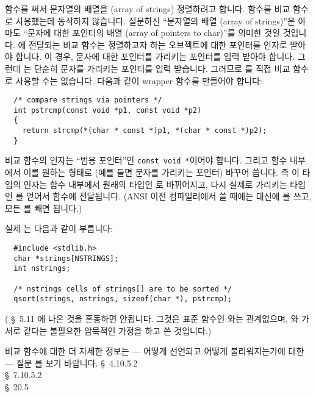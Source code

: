 \begin{faq}
	 함수를 써서 문자열의 배열을 (array of strings)
	정렬하려고 합니다.
	 함수를 비교 함수로 사용했는데 동작하지 않습니다.
\A
	질문하신 ``문자열의 배열 (array of strings)''은 아마도
	``문자에 대한 포인터의 배열 (array of pointers to char)''를
	의미한 것일 것입니다.  에 전달되는 비교 함수는
	정렬하고자 하는 오브젝트에 대한 포인터를 인자로 받아야 합니다.
	이 경우, 문자에 대한 포인터를 가리키는 포인터를 입력 받아야 합니다.
	그런데 는 단순히 문자를 가리키는 포인터를 입력
	받습니다.  그러므로 를 직접 비교 함수로 사용할 수는
	없습니다.  다음과 같이 wrapper 함수를 만들어야 합니다:

\begin{verbatim}
  /* compare strings via pointers */
  int pstrcmp(const void *p1, const void *p2)
  {
    return strcmp(*(char * const *)p1, *(char * const *)p2);
  }
\end{verbatim}

	비교 함수의 인자는 ``범용 포인터''인 \verb+const void *+이어야
        합니다. 그리고 함수 내부에서 이를 원하는 형태로 (예를 들면 문자를
        가리키는 포인터) 바꾸어 씁니다. 즉 이 타입의 인자는 함수 내부에서
        원래의 타입인 로 바뀌어지고, 다시 실제로 가리키는 타입인
        를 얻어서  함수에 전달됩니다. (ANSI 이전
        컴파일러에서 쓸 때에는  대신에 를 쓰고,
        모든 를 빼면 됩니다.)

        실제 는 다음과 같이 부릅니다:
\begin{verbatim}
  #include <stdlib.h>
  char *strings[NSTRINGS];
  int nstrings;

  /* nstrings cells of strings[] are to be sorted */
  qsort(strings, nstrings, sizeof(char *), pstrcmp);
\end{verbatim}

	(\cite{kr2} \S\ 5.11 에 나온 것을 혼동하면 안됩니다.
        그것은 표준 함수인 와는 관계없으며, 와 
        가 서로 같다는 불필요한 암묵적인 가정을 하고 쓴 것입니다.)


         비교 함수에 대한 더 자세한 정보는 --- 어떻게 선언되고 어떻게
        불리워지는가에 대한 --- 질문 를 보기 바랍니다.
\R
	\cite{ansi} \S\ 4.10.5.2 \\
	\cite{c89} \S\ 7.10.5.2 \\
	\cite{hs} \S\ 20.5 
\end{faq}

